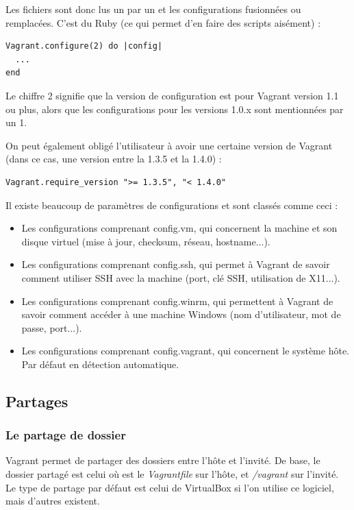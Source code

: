 \documentclass[12pt,a4paper]{article}
\begin{document}
Les fichiers sont donc lus un par un et les configurations fusionnées ou remplacées. C'est du Ruby (ce qui permet d'en faire des scripts aisément) :
\begin{lstlisting}
Vagrant.configure(2) do |config|
  ...
end
\end{lstlisting}
Le chiffre 2 signifie que la version de configuration est pour Vagrant version 1.1 ou plus, alors que les configurations pour les versions 1.0.x sont mentionnées par un 1.

On peut également obligé l'utilisateur à avoir une certaine version de Vagrant (dans ce cas, une version entre la 1.3.5 et la 1.4.0) :
\begin{lstlisting}
Vagrant.require_version ">= 1.3.5", "< 1.4.0"
\end{lstlisting}

Il existe beaucoup de paramètres de configurations et sont classés comme ceci : 
\begin{itemize}
	\item{Les configurations comprenant config.vm, qui concernent la machine et son disque virtuel (mise à jour, checksum, réseau, hostname...).}
	\item{Les configurations comprenant config.ssh, qui permet à Vagrant de savoir comment utiliser SSH avec la machine (port, clé SSH, utilisation de X11...).} 
	\item{Les configurations comprenant config.winrm, qui permettent à Vagrant de savoir comment accéder à une machine Windows (nom d'utilisateur, mot de passe, port...).}
	\item{Les configurations comprenant config.vagrant, qui concernent le système hôte. Par défaut en détection automatique.}
\end{itemize}

\subsection{Partages}

\subsubsection{Le partage de dossier}
Vagrant permet de partager des dossiers entre l'hôte et l'invité. De base, le dossier partagé est celui où est le \textit{Vagrantfile} sur l'hôte, et \textit{/vagrant} sur l'invité. Le type de partage par défaut est celui de VirtualBox si l'on utilise ce logiciel, mais d'autres existent.
\end{document}
